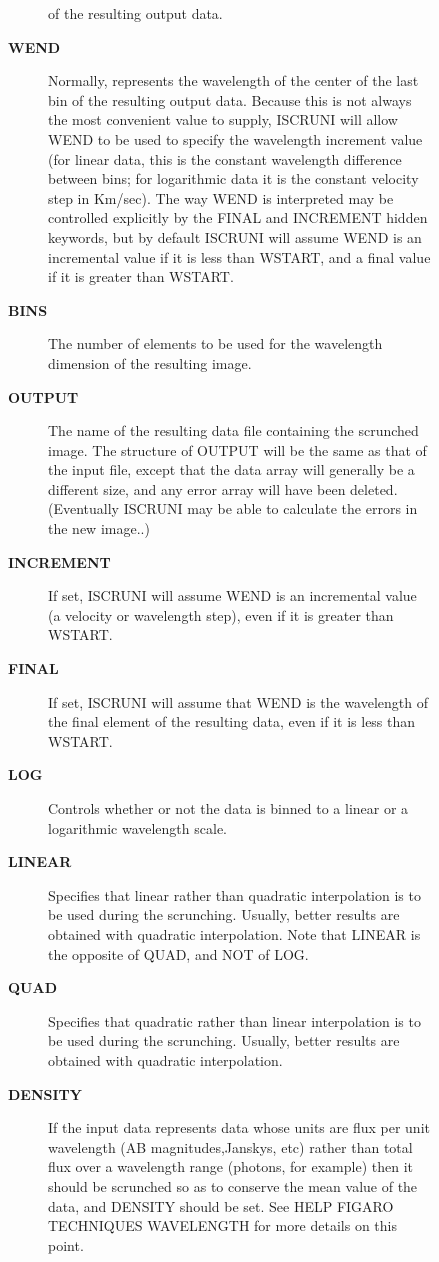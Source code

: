 \begin{description}
\begin{description}
\begin{description}
 of the resulting output data.
\item [\textbf{WEND}]
 Normally, represents the wavelength of the center of
 the last bin of the resulting output data.  Because this
 is not always the most convenient value to supply, ISCRUNI
 will allow WEND to be used to specify the wavelength
 increment value (for linear data, this is the constant
 wavelength difference between bins; for logarithmic data
 it is the constant velocity step in Km/sec).  The way
 WEND is interpreted may be controlled explicitly by the
 FINAL and INCREMENT hidden keywords, but by default ISCRUNI
 will assume WEND is an incremental value if it is less than
 WSTART, and a final value if it is greater than WSTART.
\item [\textbf{BINS}]
 The number of elements to be used for the
 wavelength dimension of the resulting image.
\item [\textbf{OUTPUT}]
 The name of the resulting data file containing
 the scrunched image. The structure of OUTPUT will be the
 same as that of the input file, except that the data array
 will generally be a different size, and any error array
 will have been deleted.  (Eventually ISCRUNI may be able
 to calculate the errors in the new image..)
\item [\textbf{INCREMENT}]
 If set, ISCRUNI will assume WEND is an incremental value
 (a velocity or wavelength step), even if it is greater
 than WSTART.
\item [\textbf{FINAL}]
 If set, ISCRUNI will assume that WEND is the wavelength
 of the final element of the resulting data, even if it
 is less than WSTART.
\item [\textbf{LOG}]
 Controls whether or not the data is binned to a linear
 or a logarithmic wavelength scale.
\item [\textbf{LINEAR}]
 Specifies that linear rather than quadratic
 interpolation is to be used during the scrunching.  Usually,
 better results are obtained with quadratic interpolation.
 Note that LINEAR is the opposite of QUAD, and NOT of LOG.
\item [\textbf{QUAD}]
 Specifies that quadratic rather than linear interpolation
 is to be used during the scrunching.  Usually, better
 results are obtained with quadratic interpolation.
\item [\textbf{DENSITY}]
 If the input data represents data whose units are flux per
 unit wavelength (AB magnitudes,Janskys, etc) rather than
 total flux over a wavelength range (photons, for example)
 then it should be scrunched so as to conserve the mean
 value of the data, and DENSITY should be set.  See HELP
 FIGARO TECHNIQUES WAVELENGTH for more details on this point.
\end{description}


\end{description}
\end{description}
